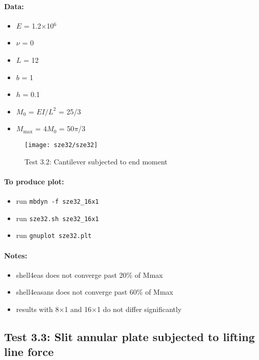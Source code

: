 \documentclass{article}
\newcommand{\mesh}[2]{#1$\times$#2}
\begin{document}
\paragraph{Data:}
\begin{itemize}
\item $E$ = 1.2$\times$10$^6$
\item $\nu$ = 0
\item $L$ = 12
\item $b$ = 1
\item $h$ = 0.1
\item $M_0$ = $EI/L^2$ = 25/3
\item $M_\text{max}$ = $4M_0$ = 50$\pi$/3
\end{itemize}

\begin{figure}[h]
\centering
{}
\psfrag{16x1}{\footnotesize \mesh{16}{1}}
\texttt{[image: sze32/sze32]}
\caption{Test 3.2: Cantilever subjected to end moment}
\label{fig:sze32}
\end{figure}

\paragraph{To produce plot:}
\begin{itemize}
\item run \verb!mbdyn -f sze32_16x1!
\item run \verb!sze32.sh sze32_16x1!
\item run \verb!gnuplot sze32.plt!
\end{itemize}

\paragraph{Notes:}
\begin{itemize}
\item shell4eas does not converge past 20\% of Mmax
\item shell4easans does not converge past 60\% of Mmax
\item results with \mesh{8}{1} and \mesh{16}{1} do not differ significantly
\end{itemize}


\subsection{Test 3.3: Slit annular plate subjected to lifting line force}
\end{document}
